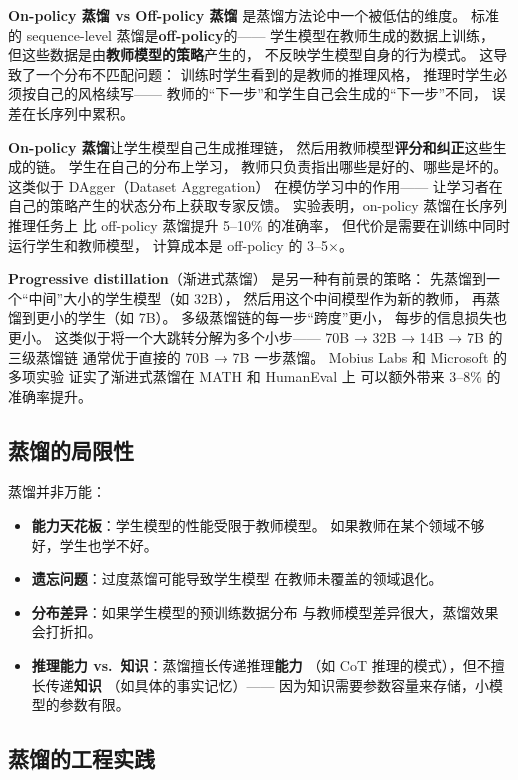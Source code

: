 \textbf{On-policy 蒸馏 vs Off-policy 蒸馏}
是蒸馏方法论中一个被低估的维度。
标准的 sequence-level 蒸馏是\textbf{off-policy}的——
学生模型在教师生成的数据上训练，
但这些数据是由\textbf{教师模型的策略}产生的，
不反映学生模型自身的行为模式。
这导致了一个分布不匹配问题：
训练时学生看到的是教师的推理风格，
推理时学生必须按自己的风格续写——
教师的“下一步”和学生自己会生成的“下一步”不同，
误差在长序列中累积。

\textbf{On-policy 蒸馏}让学生模型自己生成推理链，
然后用教师模型\textbf{评分和纠正}这些生成的链。
学生在自己的分布上学习，
教师只负责指出哪些是好的、哪些是坏的。
这类似于 DAgger（Dataset Aggregation）
在模仿学习中的作用——
让学习者在自己的策略产生的状态分布上获取专家反馈。
实验表明，on-policy 蒸馏在长序列推理任务上
比 off-policy 蒸馏提升 5--10\% 的准确率，
但代价是需要在训练中同时运行学生和教师模型，
计算成本是 off-policy 的 3--5$\times$。

\textbf{Progressive distillation}（渐进式蒸馏）
是另一种有前景的策略：
先蒸馏到一个“中间”大小的学生模型（如 32B），
然后用这个中间模型作为新的教师，
再蒸馏到更小的学生（如 7B）。
多级蒸馏链的每一步“跨度”更小，
每步的信息损失也更小。
这类似于将一个大跳转分解为多个小步——
70B → 32B → 14B → 7B 的三级蒸馏链
通常优于直接的 70B → 7B 一步蒸馏。
Mobius Labs 和 Microsoft 的多项实验
证实了渐进式蒸馏在 MATH 和 HumanEval 上
可以额外带来 3--8\% 的准确率提升。

\subsection{蒸馏的局限性}

蒸馏并非万能：
\begin{itemize}[noitemsep]
  \item \textbf{能力天花板}：学生模型的性能受限于教师模型。
        如果教师在某个领域不够好，学生也学不好。
  \item \textbf{遗忘问题}：过度蒸馏可能导致学生模型
        在教师未覆盖的领域退化。
  \item \textbf{分布差异}：如果学生模型的预训练数据分布
        与教师模型差异很大，蒸馏效果会打折扣。
  \item \textbf{推理能力 vs.\ 知识}：蒸馏擅长传递推理\textbf{能力}
        （如 CoT 推理的模式），但不擅长传递\textbf{知识}
        （如具体的事实记忆）——
        因为知识需要参数容量来存储，小模型的参数有限。
\end{itemize}

\subsection{蒸馏的工程实践}

